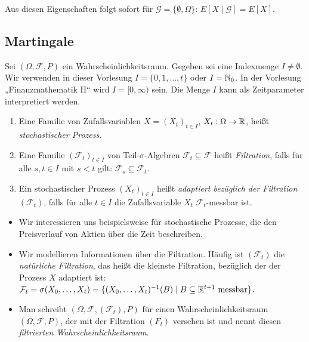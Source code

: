 \documentclass[a4paper,twoside,DIV15,BCOR12mm]{scrbook}
\newcommand{\cF}{\mathcal F}
\begin{document}
Aus diesen Eigenschaften folgt sofort für $\mathcal G = \{\emptyset, \Omega\}$: $E[X\mid\mathcal G] = E[X]$.


\subsection{Martingale}

Sei $(\Omega, \cF, P)$ ein Wahrscheinlichkeitsraum. Gegeben sei eine Indexmenge $I\ne \emptyset$. Wir verwenden in dieser Vorlesung $I=\{0, 1,\ldots,t\}$ oder $I=\mathbb{N}_0$. In der Vorlesung „Finanzmathematik II“ wird $I=[0,\infty)$ sein. Die Menge $I$ kann als Zeitparameter interpretiert werden.

\begin{definition}
\begin{enumerate}
\item Eine Familie von Zufallsvariablen $X=(X_t)_{t\in I}$, $X_t:\Omega \to \mathbb{R}$, heißt \emph{stochastischer Prozess}.
\item Eine Familie $(\cF_t)_{t\in I}$ von Teil-$\sigma$-Algebren $\cF_t \subseteq \cF$ heißt \emph{Filtration}, falls für alle $s,t\in I$ mit $s<t$ gilt: $\cF_s \subseteq \cF_t$.
\item Ein stochastischer Prozess $(X_t)_{t\in I}$ heißt \emph{adaptiert bezüglich der Filtration $(\cF_t)$},  falls für alle $t\in I$ die Zufallsvariable $X_t$ $\cF_t$-messbar ist.
\end{enumerate}
\end{definition}

\begin{bemerkung}
\begin{itemize}
\item Wir interessieren uns beispielsweise für stochastische Prozesse, die den Preisverlauf von Aktien über die Zeit beschreiben.
\item Wir modellieren Informationen über die Filtration. Häufig ist $(\cF_t)$ die \emph{natürliche Filtration}, das heißt die kleinste Filtration, bezüglich der der Prozess $X$ adaptiert ist: $\cF_t = \sigma(X_0,\ldots,X_t) = \{(X_0,\ldots,X_t)^{-1}(B)\mid B\subseteq \MdR^{t+1} \text{ messbar}\}$.
\item Man schreibt $(\Omega, \cF, (\cF_t), P)$ für einen Wahrscheinlichkeitsraum $(\Omega, \cF, P)$, der mit der Filtration $(F_t)$ versehen ist und nennt diesen \emph{filtrierten Wahrscheinlichkeitsraum}.
\end{itemize}
\end{bemerkung}
\end{document}
